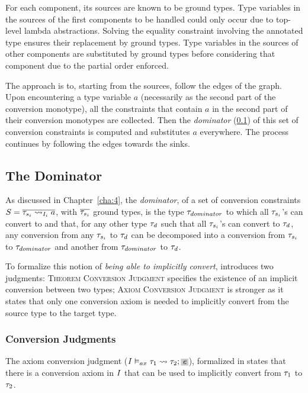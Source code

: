 For each component, its sources are known to be ground types. Type variables in the sources of the first components to be handled could only occur due to top-level lambda abstractions. Solving the equality constraint involving the annotated type ensures their replacement by ground types. Type variables in the sources of other components are substituted by ground types before considering that component due to the partial order enforced.

The approach is to, starting from the sources, follow the edges of the graph. Upon encountering a type variable $a$ (necessarily as the second part of the conversion monotype), all the constraints that contain $a$ in the second part of their conversion monotypes are collected. Then the \textit{dominator} (\ref{dominator}) of this set of conversion constraints is computed and substitutes $a$ everywhere. The process continues by following the edges towards the sinks.

\subsection{The Dominator}
\label{dominator}
As discussed in Chapter~\ref{cha:4}, the \textit{dominator}, of a set of conversion constraints $S=\overline{\convX{\imEnv_i}{\type_{s_i}}{a}}$, with $\overline{\type_{s_i}}$ ground types, is the type $\type_{dominator}$ to which all $\type_{s_i}$'s can convert to and that, for any other type $\type_d$ such that  all $\type_{s_i}$'s can convert to $\type_d$, any conversion from any $\type_{s_i}$ to $\type_d$ can be decomposed into a conversion from $\type_{s_i}$ to $\type_{dominator}$ and another from $\type_{dominator}$ to $\type_d$.

To formalize this notion of \textit{being able to implicitly convert},  introduces two judgments: \textsc{Theorem Conversion Judgment} specifies the existence of an implicit conversion between two types; \textsc{Axiom Conversion Judgment} is stronger as it states that only one conversion axiom is needed to implicitly convert from the source type to the target type.


\subsubsection{Conversion Judgments}
\label{susec}
The axiom conversion judgment ($\convax{\imEnv}{\type_1}{\type_2}{\term}$), formalized in  states that there is a conversion axiom in $\imEnv$ that can be used to implicitly convert from $\type_1$ to $\type_2$.

